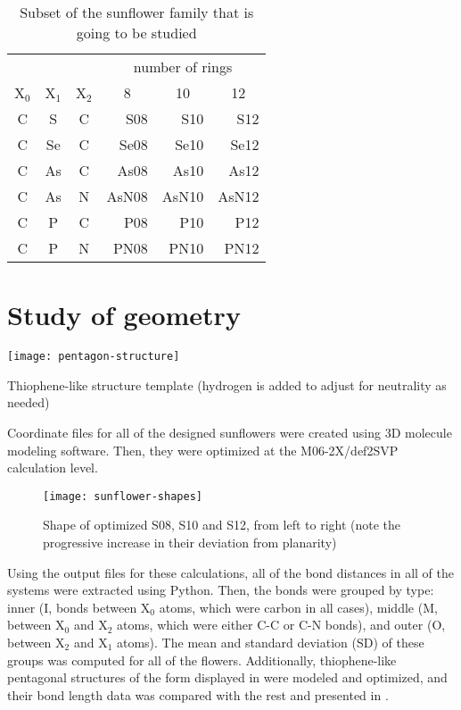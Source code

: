 \begin{table}
    \centering
    \caption[Sunflowers in this study]{Subset of the sunflower family that is going to be studied}
    \begin{tabular}{@{}cccrrr@{}}
        \toprule
        &&& \multicolumn{3}{c}{number of rings} \\
        X$_0$ & X$_1$ & X$_2$ & \multicolumn{1}{c}{8} & \multicolumn{1}{c}{10} & \multicolumn{1}{c}{12} \\
        \midrule
        C & S & C & S08 & S10 & S12 \\
        C & Se & C & Se08 & Se10 & Se12 \\
        C & As & C & As08 & As10 & As12 \\
        C & As & N & AsN08 & AsN10 & AsN12 \\
        C & P & C & P08 & P10 & P12 \\
        C & P & N & PN08 & PN10 & PN12 \\
        \bottomrule
    \end{tabular}
\end{table}


\section{Study of geometry}

\begin{marginfigure}
    \texttt{[image: pentagon-structure]}
    \caption[Thiophene-like structure template]{Thiophene-like structure template (hydrogen is added to adjust for neutrality as needed)}
\end{marginfigure}

Coordinate files for all of the designed sunflowers were created using 3D molecule modeling software.
Then, they were optimized at the M06-2X/def2SVP calculation level.

\begin{figure}
    \texttt{[image: sunflower-shapes]}
    \caption[Shape of the sunflowers]{Shape of optimized S08, S10 and S12, from left to right (note the progressive increase in their deviation from planarity)}
\end{figure}

Using the output files for these calculations, all of the bond distances in all of the systems were extracted using Python.
Then, the bonds were grouped by type: inner (I, bonds between X$_0$ atoms, which were carbon in all cases), middle (M, between X$_0$ and X$_2$ atoms, which were either C-C or C-N bonds), and outer (O, between X$_2$ and X$_1$ atoms).
The mean and standard deviation (SD) of these groups was computed for all of the flowers.
Additionally, thiophene-like pentagonal structures of the form displayed in  were modeled and optimized, and their bond length data was compared with the rest and presented in .

